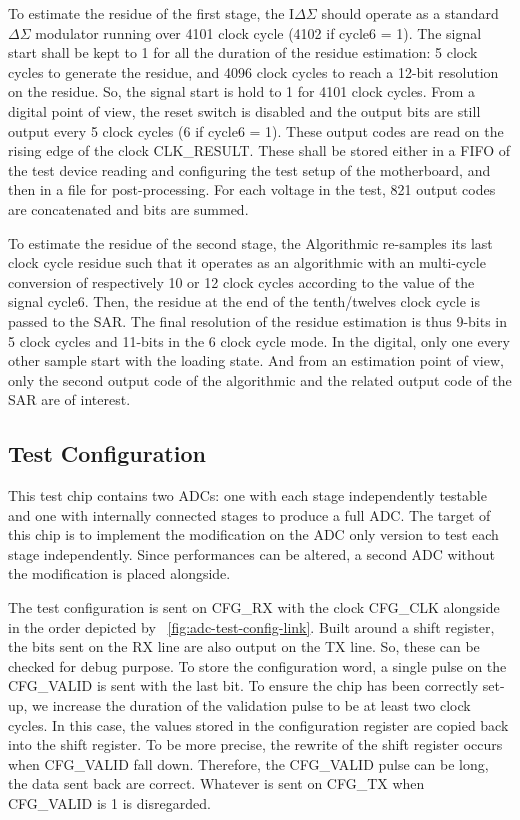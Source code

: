 To estimate the residue of the first stage, the I\(\Delta \Sigma\) should operate as a standard \(\Delta \Sigma\) modulator running over 4101 clock cycle (4102 if cycle6 = 1). The signal start shall be kept to 1 for all the duration of the residue estimation: 5 clock cycles to generate the residue, and 4096 clock cycles to reach a 12-bit resolution on the residue. So, the signal start is hold to 1 for 4101 clock cycles. From a digital point of view, the reset switch is disabled and the output bits are still output every 5 clock cycles (6 if cycle6 = 1). These output codes are read on the rising edge of the clock CLK\_RESULT\@. These shall be stored either in a FIFO of the test device reading and configuring the test setup of the motherboard, and then in a file for post-processing. For each voltage in the test, 821 output codes are concatenated and bits are summed.

To estimate the residue of the second stage, the Algorithmic re-samples its last clock cycle residue such that it operates as an algorithmic with an multi-cycle conversion of respectively 10 or 12 clock cycles according to the value of the signal cycle6. Then, the residue at the end of the tenth/twelves clock cycle is passed to the SAR\@. The final resolution of the residue estimation is thus 9-bits in 5 clock cycles and 11-bits in the 6 clock cycle mode. In the digital, only one every other sample start with the loading state. And from an estimation point of view, only the second output code of the algorithmic and the related output code of the SAR are of interest.

\subsection{Test Configuration}
This test chip contains two ADCs: one with each stage independently testable and one with internally connected stages to produce a full ADC\@. The target of this chip is to implement the modification on the ADC only version to test each stage independently. Since performances can be altered, a second ADC without the modification is placed alongside.

The test configuration is sent on CFG\_RX with the clock CFG\_CLK alongside in the order depicted by \figurename~\ref{fig:adc-test-config-link}. Built around a shift register, the bits sent on the RX line are also output on the TX line. So, these can be checked for debug purpose. To store the configuration word, a single pulse on the CFG\_VALID is sent with the last bit. To ensure the chip has been correctly set-up, we increase the duration of the validation pulse to be at least two clock cycles. In this case, the values stored in the configuration register are copied back into the shift register. To be more precise, the rewrite of the shift register occurs when CFG\_VALID fall down. Therefore, the CFG\_VALID pulse can be long, the data sent back are correct. Whatever is sent on CFG\_TX when CFG\_VALID is 1 is disregarded.

